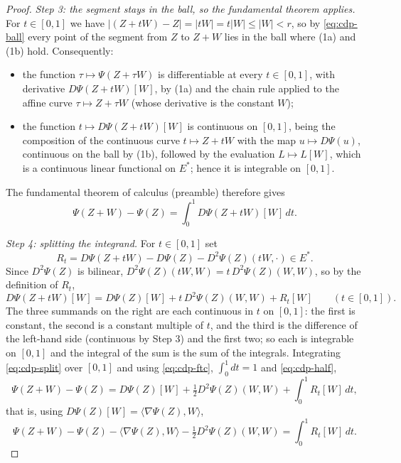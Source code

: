 \begin{proof}
\emph{Step 3: the segment stays in the ball, so the fundamental theorem applies.}
For $t\in[0,1]$ we have $|(Z+tW)-Z|=|tW|=t|W|\le|W|<r$, so by
\eqref{eq:cdp-ball} every point of the segment from $Z$ to $Z+W$ lies in the
ball where (1a) and (1b) hold. Consequently:
\begin{itemize}
\item the function $\tau\mapsto\Psi(Z+\tau W)$ is differentiable at every
  $t\in[0,1]$, with derivative $D\Psi(Z+tW)[W]$, by (1a) and the chain rule
  applied to the affine curve $\tau\mapsto Z+\tau W$ (whose derivative is the
  constant $W$);
\item the function $t\mapsto D\Psi(Z+tW)[W]$ is continuous on $[0,1]$, being the
  composition of the continuous curve $t\mapsto Z+tW$ with the map
  $u\mapsto D\Psi(u)$, continuous on the ball by (1b), followed by the
  evaluation $L\mapsto L[W]$, which is a continuous linear functional on
  $E^\ast$; hence it is integrable on $[0,1]$.
\end{itemize}
The fundamental theorem of calculus (preamble) therefore gives
\begin{equation}\label{eq:cdp-ftc}
  \Psi(Z+W)-\Psi(Z)=\int_0^1D\Psi(Z+tW)[W]\,dt .
\end{equation}

\emph{Step 4: splitting the integrand.}
For $t\in[0,1]$ set
\[
  R_t=D\Psi(Z+tW)-D\Psi(Z)-D^2\Psi(Z)(tW,\cdot)\in E^\ast .
\]
Since $D^2\Psi(Z)$ is bilinear, $D^2\Psi(Z)(tW,W)=t\,D^2\Psi(Z)(W,W)$, so by the
definition of $R_t$,
\begin{equation}\label{eq:cdp-split}
  D\Psi(Z+tW)[W]=D\Psi(Z)[W]+t\,D^2\Psi(Z)(W,W)+R_t[W]\qquad(t\in[0,1]).
\end{equation}
The three summands on the right are each continuous in $t$ on $[0,1]$: the first
is constant, the second is a constant multiple of $t$, and the third is the
difference of the left-hand side (continuous by Step 3) and the first two; so
each is integrable on $[0,1]$ and the integral of the sum is the sum of the
integrals. Integrating \eqref{eq:cdp-split} over $[0,1]$ and using
\eqref{eq:cdp-ftc}, $\int_0^1dt=1$ and \eqref{eq:cdp-half},
\[
  \Psi(Z+W)-\Psi(Z)
   =D\Psi(Z)[W]+\tfrac12D^2\Psi(Z)(W,W)+\int_0^1R_t[W]\,dt,
\]
that is, using $D\Psi(Z)[W]=\langle\nabla\Psi(Z),W\rangle$,
\begin{equation}\label{eq:cdp-err}
  \Psi(Z+W)-\Psi(Z)-\langle\nabla\Psi(Z),W\rangle-\tfrac12D^2\Psi(Z)(W,W)
   =\int_0^1R_t[W]\,dt .
\end{equation}


\end{proof}
